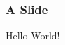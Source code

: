 \documentclass{beamer}
\begin{document}
    \begin{frame}
        \frametitle{A Slide}
        Hello World!
    \end{frame}
\end{document}
